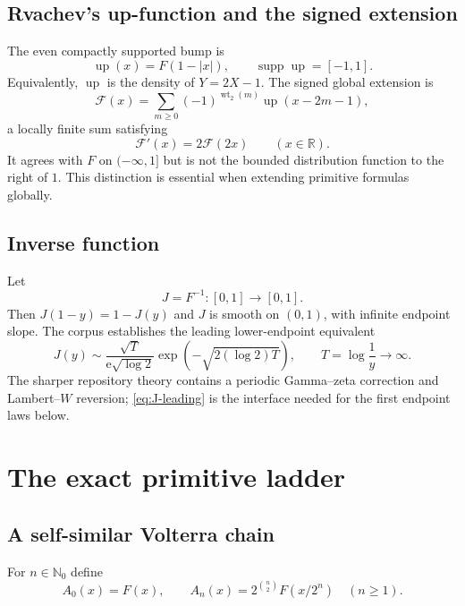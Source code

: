 \documentclass[11pt,oneside]{article}
\numberwithin{equation}{section}
\theoremstyle{definition}
\theoremstyle{remark}
\newcommand{\R}{\mathbb R}
\newcommand{\N}{\mathbb N}
\newcommand{\Up}{\operatorname{up}}
\newcommand{\InvF}{J}
\newcommand{\e}{\mathrm e}
\newcommand{\supp}{\operatorname{supp}}
\newcommand{\wt}{\operatorname{wt}_2}
\begin{document}
\subsection{Rvachev's up-function and the signed extension}
The even compactly supported bump is
\begin{equation}
 \Up(x)=F(1-|x|),\qquad \supp\Up=[-1,1].                   \label{eq:up-def}
\end{equation}
Equivalently, $\Up$ is the density of $Y=2X-1$.  The signed global extension is
\begin{equation}
 \mathcal F(x)=\sum_{m\ge0}(-1)^{\wt(m)}\Up(x-2m-1),       \label{eq:global-def}
\end{equation}
a locally finite sum satisfying
\begin{equation}
 \mathcal F'(x)=2\mathcal F(2x)\qquad(x\in\R).             \label{eq:global-diffeq}
\end{equation}
It agrees with $F$ on $(-\infty,1]$ but is not the bounded distribution
function to the right of $1$.  This distinction is essential when extending
primitive formulas globally.

\subsection{Inverse function}
Let
\begin{equation}
 \InvF=F^{-1}:[0,1]\longrightarrow[0,1].                  \label{eq:J-def}
\end{equation}
Then $\InvF(1-y)=1-\InvF(y)$ and $\InvF$ is smooth on $(0,1)$, with infinite
endpoint slope.  The corpus establishes the leading lower-endpoint equivalent
\begin{equation}
 \InvF(y)\sim
 \frac{\sqrt{T}}{\e\sqrt{\log2}}
 \exp\!\left(-\sqrt{2(\log2)T}\right),
 \qquad T=\log\frac1y\longrightarrow\infty.               \label{eq:J-leading}
\end{equation}
The sharper repository theory contains a periodic Gamma--zeta correction and
Lambert--$W$ reversion; \eqref{eq:J-leading} is the interface needed for the
first endpoint laws below.

\section{The exact primitive ladder}
\label{sec:ladder}

\subsection{A self-similar Volterra chain}
For $n\in\N_0$ define
\begin{equation}
 A_0(x)=F(x),\qquad
 A_n(x)=2^{\binom n2}F(x/2^n)\quad(n\ge1).                 \label{eq:An-def}
\end{equation}
\end{document}
